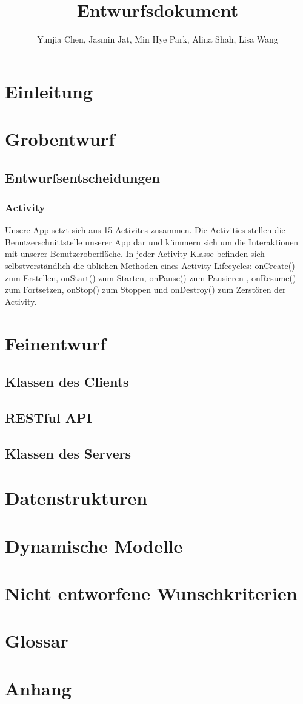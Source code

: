 \documentclass[a4paper]{scrreprt}
\title{Entwurfsdokument}
\author{Yunjia Chen, Jasmin Jat, Min Hye Park, Alina Shah, Lisa Wang}
\begin{document}
\maketitle
\tableofcontents 
\newpage
\chapter{Einleitung}

\chapter{Grobentwurf}
	\section{Entwurfsentscheidungen}
    	\subsection{Activity}
        Unsere App setzt sich aus 15 Activites zusammen. Die Activities stellen die Benutzerschnittstelle unserer App dar und kümmern sich um die Interaktionen mit unserer Benutzeroberfläche. In jeder Activity-Klasse befinden sich selbstverständlich die üblichen Methoden eines Activity-Lifecycles: onCreate() zum Erstellen, onStart() zum Starten, onPause() zum Pausieren , onResume() zum Fortsetzen, onStop() zum Stoppen und onDestroy() zum Zerstören der Activity.
        
        
\newpage

\chapter{Feinentwurf}
	\section{Klassen des Clients}
	
	\clearpage
	
	\clearpage
	
	\clearpage
	\section{RESTful API}
	
	\clearpage
	\section{Klassen des Servers}
	
 

\chapter{Datenstrukturen}

\chapter{Dynamische Modelle}

\chapter{Nicht entworfene Wunschkriterien}

\chapter{Glossar}

\chapter{Anhang}
\end{document}
